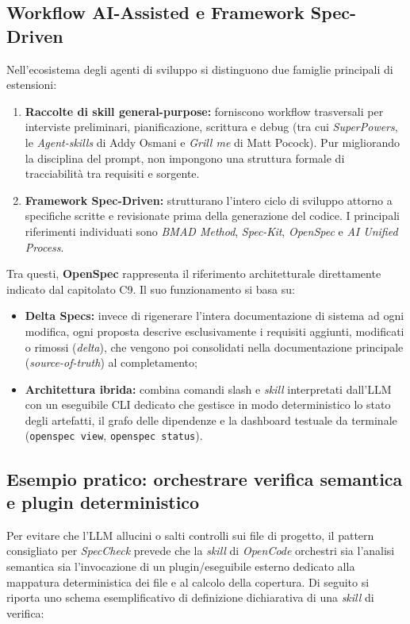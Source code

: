 \documentclass[a4paper, 11pt]{article}
\begin{document}
\subsection{Workflow AI-Assisted e Framework Spec-Driven}
Nell'ecosistema degli agenti di sviluppo si distinguono due famiglie principali di estensioni:
\begin{enumerate}[noitemsep]
    \item \textbf{Raccolte di skill general-purpose:} forniscono workflow trasversali per interviste preliminari, pianificazione, scrittura e debug (tra cui \textit{SuperPowers}, le \textit{Agent-skills} di Addy Osmani e \textit{Grill me} di Matt Pocock). Pur migliorando la disciplina del prompt, non impongono una struttura formale di tracciabilità tra requisiti e sorgente.
    \item \textbf{Framework Spec-Driven:} strutturano l'intero ciclo di sviluppo attorno a specifiche scritte e revisionate prima della generazione del codice. I principali riferimenti individuati sono \textit{BMAD Method}, \textit{Spec-Kit}, \textit{OpenSpec} e \textit{AI Unified Process}.
\end{enumerate}

Tra questi, \textbf{OpenSpec} rappresenta il riferimento architetturale direttamente indicato dal capitolato C9. Il suo funzionamento si basa su:
\begin{itemize}[noitemsep]
    \item \textbf{Delta Specs:} invece di rigenerare l'intera documentazione di sistema ad ogni modifica, ogni proposta descrive esclusivamente i requisiti aggiunti, modificati o rimossi (\textit{delta}), che vengono poi consolidati nella documentazione principale (\textit{source-of-truth}) al completamento;
    \item \textbf{Architettura ibrida:} combina comandi slash e \textit{skill} interpretati dall'LLM con un eseguibile CLI dedicato che gestisce in modo deterministico lo stato degli artefatti, il grafo delle dipendenze e la dashboard testuale da terminale (\texttt{openspec view}, \texttt{openspec status}).
\end{itemize}

\subsection{Esempio pratico: orchestrare verifica semantica e plugin deterministico}
Per evitare che l'LLM allucini o salti controlli sui file di progetto, il pattern consigliato per \textit{SpecCheck} prevede che la \textit{skill} di \textit{OpenCode} orchestri sia l'analisi semantica sia l'invocazione di un plugin/eseguibile esterno dedicato alla mappatura deterministica dei file e al calcolo della copertura. Di seguito si riporta uno schema esemplificativo di definizione dichiarativa di una \textit{skill} di verifica:
\end{document}
